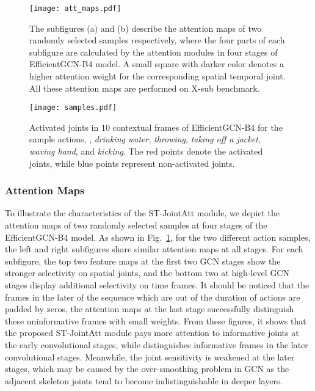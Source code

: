 \documentclass[10pt,journal,compsoc]{IEEEtran}
\begin{document}
\begin{figure}[t]
  \vspace{-0.2cm}
  \centerline{\texttt{[image: att\_maps.pdf]}}
  \vspace{-0.4cm}
  \caption{The subfigures (a) and (b) describe the attention maps of two randomly selected samples respectively, where the four parts of each subfigure are calculated by the attention modules in four stages of EfficientGCN-B4 model. A small square with darker color denotes a higher attention weight for the corresponding spatial temporal joint. All these attention maps are performed on X-sub benchmark. \bv}\label{fig:att_maps}
\end{figure}

\begin{figure*}[t]
  \vspace{-0.2cm}
  \centerline{\texttt{[image: samples.pdf]}}
  \vspace{-0.4cm}
  \caption{Activated joints in 10 contextual frames of EfficientGCN-B4 for the sample actions, \ie, {\it drinking water}, {\it throwing}, {\it taking off a jacket}, {\it waving hand}, and {\it kicking}. The {\color{red}red} points denote the activated joints, while {\color{blue}blue} points represent non-activated joints. \bv}\label{fig:samples}
  \vspace{-0.2cm}
\end{figure*}

\subsubsection{Attention Maps}

To illustrate the characteristics of the ST-JointAtt module, we depict the attention maps of two randomly selected samples at four stages of the EfficientGCN-B4 model. As shown in Fig.~\ref{fig:att_maps}, for the two different action samples, the left and right subfigures share similar attention maps at all stages. For each subfigure, the top two feature maps at the first two GCN stages show the stronger selectivity on spatial joints, and the bottom two at high-level GCN stages display additional selectivity on time frames. It should be noticed that the frames in the later of the sequence which are out of the duration of actions are padded by zeros, the attention maps at the last stage successfully distinguish these uninformative frames with small weights. From these figures, it shows that the proposed ST-JointAtt module pays more attention to informative joints at the early convolutional stages, while distinguishes informative frames in the later convolutional stages. Meanwhile, the joint sensitivity is weakened at the later stages, which may be caused by the over-smoothing problem in GCN as the adjacent skeleton joints tend to become indistinguishable in deeper layers.
\end{document}
